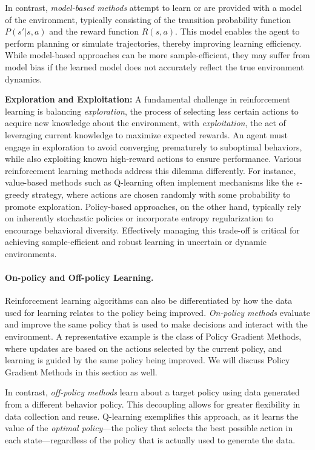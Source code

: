 \documentclass[12pt,a4paper,twoside,openany]{book}
\begin{document}
In contrast, \emph{model-based methods} attempt to learn or are provided with a model of the environment, typically consisting of the transition probability function \(P(s'|s,a)\) and the reward function \(R(s,a)\). This model enables the agent to perform planning or simulate trajectories, thereby improving learning efficiency. While model-based approaches can be more sample-efficient, they may suffer from model bias if the learned model does not accurately reflect the true environment dynamics.

\medskip
\noindent\textbf{Exploration and Exploitation:}  
A fundamental challenge in reinforcement learning is balancing \emph{exploration}, the process of selecting less certain actions to acquire new knowledge about the environment, with \emph{exploitation}, the act of leveraging current knowledge to maximize expected rewards. An agent must engage in exploration to avoid converging prematurely to suboptimal behaviors, while also exploiting known high-reward actions to ensure performance. Various reinforcement learning methods address this dilemma differently. For instance, value-based methods such as Q-learning often implement mechanisms like the \(\epsilon\)-greedy strategy, where actions are chosen randomly with some probability to promote exploration. Policy-based approaches, on the other hand, typically rely on inherently stochastic policies or incorporate entropy regularization to encourage behavioral diversity. Effectively managing this trade-off is critical for achieving sample-efficient and robust learning in uncertain or dynamic environments.

\medskip
\paragraph{On-policy and Off-policy Learning.}
Reinforcement learning algorithms can also be differentiated by how the data used for learning relates to the policy being improved. \emph{On-policy methods} evaluate and improve the same policy that is used to make decisions and interact with the environment. A representative example is the class of Policy Gradient Methods, where updates are based on the actions selected by the current policy, and learning is guided by the same policy being improved. We will discuss Policy Gradient Methods in this section as well.

In contrast, \emph{off-policy methods} learn about a target policy using data generated from a different behavior policy. This decoupling allows for greater flexibility in data collection and reuse. Q-learning exemplifies this approach, as it learns the value of the \emph{optimal policy}—the policy that selects the best possible action in each state—regardless of the policy that is actually used to generate the data. 
\end{document}
